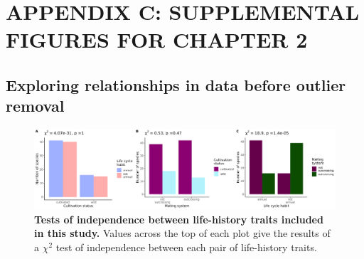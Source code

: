 \documentclass[12pt]{article}
\begin{document}
\newpage

\section*{APPENDIX C: SUPPLEMENTAL FIGURES FOR CHAPTER 2}

\setcounter{figure}{0}
\renewcommand{\figurename}{Figure}
\renewcommand{\thefigure}{C\arabic{figure}}

\vspace{12pt}

\subsection*{Exploring relationships in data before outlier removal}
\begin{figure}[H]
    \centering
    \includegraphics[width=\textwidth]{figures/appendix_d/cultivation_vs_generation_and_mating2024-12-12.jpg}
    \caption{\textbf{Tests of independence between life-history traits included in this study.} Values across the top of each plot give the results of a $\chi^2$ test of independence between each pair of life-history traits.}
\end{figure}
\end{document}
